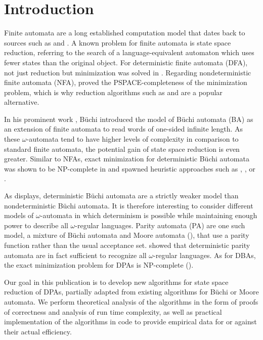 \section{Introduction}

Finite automata are a long established computation model that dates back to sources such as \cite{McCulloch1990} and \cite{RabinScott1959}. A known problem for finite automata is state space reduction, referring to the search of a language-equivalent automaton which uses fewer states than the original object. For deterministic finite automata (DFA), not just reduction but minimization was solved in \cite{Hopcroft1971}. Regarding nondeterministic finite automata (NFA), \cite{JianRavikumar1991} proved the PSPACE-completeness of the minimization problem, which is why reduction algorithms such as \cite{ChamparnaudCoulon2004} and \cite{BonchiPous2013} are a popular alternative.

In his prominent work \cite{Buchi1966}, B\"uchi introduced the model of B\"uchi automata (BA) as an extension of finite automata to read words of one-sided infinite length. As these $\omega$-automata tend to have higher levels of complexity in comparison to standard finite automata, the potential gain of state space reduction is even greater. Similar to NFAs, exact minimization for deterministic B\"uchi automata was shown to be NP-complete in \cite{Schewe2010} and spawned heuristic approaches such as \cite{Schewe2010}, \cite{MayrClemente2012}, or \cite{EtessamiWilkeSchuller2001}. 

As \cite{Thomas1991} displays, deterministic B\"uchi automata are a strictly weaker model than nondeterministic Büchi automata. It is therefore interesting to consider different models of $\omega$-automata in which determinism is possible while maintaining enough power to describe all $\omega$-regular languages. Parity automata (PA) are one such model, a mixture of B\"uchi automata and Moore automata (\cite{Moore56}), that use a parity function rather than the usual acceptance set. \cite{Piterman2007} showed that deterministic parity automata are in fact sufficient to recognize all $\omega$-regular languages. As for DBAs, the exact minimization problem for DPAs is NP-complete (\cite{Schewe2010}).

Our goal in this publication is to develop new algorithms for state space reduction of DPAs, partially adapted from existing algorithms for B\"uchi or Moore automata. We perform theoretical analysis of the algorithms in the form of proofs of correctness and analysis of run time complexity, as well as practical implementation of the algorithms in code to provide empirical data for or against their actual efficiency.